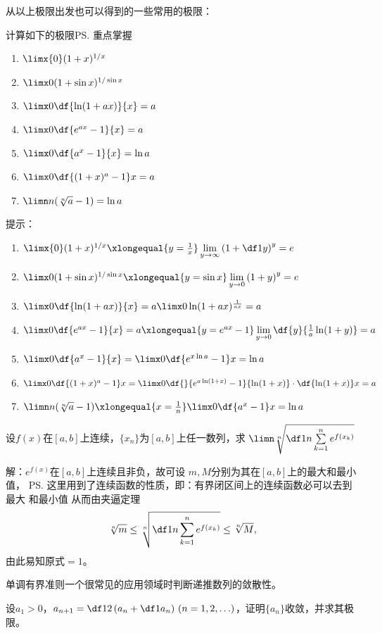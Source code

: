 \bs
从以上极限出发也可以得到的一些常用的极限：

\egz 计算如下的极限\ps{\baa 重点掌握}
\begin{enumerate}[(1)]
   \setlength{\itemindent}{1cm}
  \item $\limx{0}(1+x)^{1/x}$ 
  \item $\limx 0(1+\sin x)^{1/\sin x}$ 
  \item $\limx 0\df{\ln(1+ax)}{x}=a$
  \item $\limx 0\df{e^{ax}-1}{x}=a$ 
  \item $\limx 0\df{a^x-1}{x}=\ln a$ 
  \item $\limx 0\df{(1+x)^a-1}x=a$
  \item $\limn n(\sqrt[n]{a}-1)=\ln a$ 
\end{enumerate}

\ifhint
提示：
\begin{enumerate}[(1)]
	\setlength{\itemindent}{1cm}
	\item $\limx{0}(1+x)^{1/x}
	\xlongequal{y=\frac1x}
	\lim\limits_{y\to\infty}\left(1+\df1y\right)^y=e$ 
	\item $\limx 0(1+\sin x)^{1/\sin x}
	\xlongequal{y=\sin x}\lim\limits_{y\to0}\left(1+y\right)^y=e$ 
	\item $\limx 0\df{\ln(1+ax)}{x}
	=a\limx0\ln(1+ax)^{\frac1{ax}}=a$
	\item $\limx 0\df{e^{ax}-1}{x}=a
	\xlongequal{y=e^{ax}-1}
	\lim\limits_{y\to0}\df{y}{\frac1a\ln(1+y)}=a$ 
	\item $\limx0\df{a^x-1}{x}
	=\limx0\df{e^{x\ln a}-1}x=\ln a$ 
	\item $\limx0\df{(1+x)^a-1}x
	=\limx0\df{}{e^{a\ln(1+x)}-1}{\ln(1+x)}
	\cdot\df{\ln(1+x)}x=a$
	\item $\limn n(\sqrt[n]{a}-1)
	\xlongequal{x=\frac1n}
	\limx0\df{a^x-1}x=\ln a$ 
\end{enumerate}
\fi

\bs
\egz 设$f(x)$在$[a,b]$上连续，$\{x_n\}$为$[a,b]$上任一数列，求
$\limn\sqrt[n]{\df1n\sum\limits_{k=1}^ne^{f(x_k)}}$

解：$e^{f(x)}$在$[a,b]$上连续且非负，故可设
$m,M$分别为其在$[a,b]$上的最大和最小值，
\ps{这里用到了连续函数的性质，即：有界闭区间上的连续函数必可以去到最大
和最小值}
从而由夹逼定理
$$\sqrt[n]m\leq\sqrt[n]{\df1n\sum\limits_{k=1}^ne^{f(x_k)}}\leq\sqrt[n]M,$$
由此易知原式$=1$。\fin

\bs
单调有界准则一个很常见的应用领域时判断递推数列的敛散性。

\egz 
设$a_1>0$，$a_{n+1}=\df 12\left(a_n+\df 1{a_n}\right)\,
(n=1,2,\ldots)$，证明$\{a_n\}$收敛，并求其极限。

